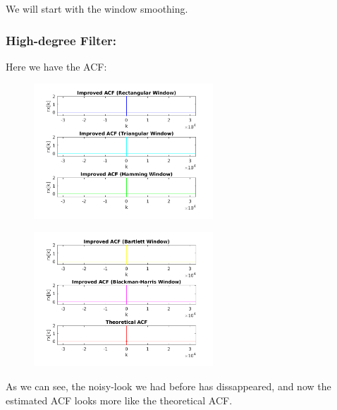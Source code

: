 \documentclass[a4paper,11pt]{article}
\begin{document}
We will start with the window smoothing.

\subsubsection{High-degree Filter:}

Here we have the ACF:

\begin{figure}[!hp]
    \begin{center}
      \includegraphics[width=0.6\textwidth]{images/study2/acf_hd_plot1.png}
    \end{center}
\end{figure}

\begin{figure}[!hp]
    \begin{center}
      \includegraphics[width=0.6\textwidth]{images/study2/acf_hd_plot2.png}
    \end{center}
\end{figure}

As we can see, the noisy-look we had before has dissappeared, and now the
estimated ACF looks more like the theoretical ACF.

\newpage
\end{document}
